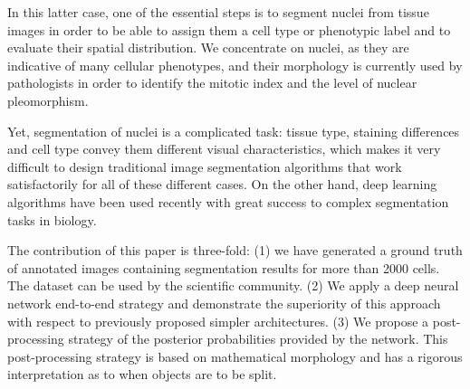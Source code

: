 \documentclass{article}
\begin{document}
In this latter case, one of the essential steps is to
segment nuclei from tissue images in order to be able to
assign them a cell type or phenotypic label and to evaluate their
spatial distribution. We concentrate on nuclei, as they are indicative
of many cellular phenotypes\cite{Chow2012}, and their morphology is 
currently used by pathologists in order to
identify the mitotic index and the level of nuclear
pleomorphism\cite{Elston1991}. 

Yet, segmentation of nuclei is a
complicated task: tissue type, staining differences and cell type
convey them different visual characteristics, which makes it very difficult to
design traditional image segmentation algorithms that work
satisfactorily for all of these different cases. On the other hand,
deep learning algorithms have been used recently with great success to
complex segmentation tasks in biology\cite{Ciresan2012,Ronneberger2015}. 

The contribution of this paper is three-fold: (1) we have generated a
ground truth of annotated images containing segmentation results for
more than 2000 cells. The dataset can be used by the scientific
community. (2) We apply a deep neural network end-to-end strategy and
demonstrate the superiority of this approach with respect to
previously proposed simpler architectures. (3) We propose a
post-processing strategy of the posterior probabilities provided by
the network. This post-processing strategy is based on mathematical
morphology and has a rigorous interpretation as to when objects are to
be split. 
\end{document}
